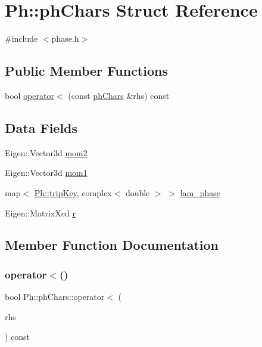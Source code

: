 \hypertarget{structPh_1_1phChars}{}\section{Ph\+:\+:ph\+Chars Struct Reference}
\label{structPh_1_1phChars}


{\ttfamily \#include $<$phase.\+h$>$}

\subsection*{Public Member Functions}
\begin{DoxyCompactItemize}
\item 
bool \mbox{\hyperlink{structPh_1_1phChars_af5b8755c7bff306b28edc0b5335e3541}{operator$<$}} (const \mbox{\hyperlink{structPh_1_1phChars}{ph\+Chars}} \&rhs) const
\end{DoxyCompactItemize}
\subsection*{Data Fields}
\begin{DoxyCompactItemize}
\item 
Eigen\+::\+Vector3d \mbox{\hyperlink{structPh_1_1phChars_a1458e97056bb5c7a5f99a2b81e33eddc}{mom2}}
\item 
Eigen\+::\+Vector3d \mbox{\hyperlink{structPh_1_1phChars_a3f4e550bbbc61af48cbe3c39bbea4147}{mom1}}
\item 
map$<$ \mbox{\hyperlink{namespacePh_afdd5bf3d7b37625115089ea3048e0cbb}{Ph\+::trip\+Key}}, complex$<$ double $>$ $>$ \mbox{\hyperlink{structPh_1_1phChars_af79d4feac7df252a92fc9faf0500d214}{lam\+\_\+phase}}
\item 
Eigen\+::\+Matrix\+Xcd \mbox{\hyperlink{structPh_1_1phChars_a953b0c01407ecc9b6ba27aa49a9f8587}{r}}
\end{DoxyCompactItemize}


\subsection{Member Function Documentation}
\mbox{\label{structPh_1_1phChars_af5b8755c7bff306b28edc0b5335e3541}} 
\subsubsection{\texorpdfstring{operator$<$()}{operator<()}}
{\footnotesize\ttfamily bool Ph\+::ph\+Chars\+::operator$<$ (\begin{DoxyParamCaption}\item[{const \mbox{\hyperlink{structPh_1_1phChars}{ph\+Chars}} \&}]{rhs }\end{DoxyParamCaption}) const}



